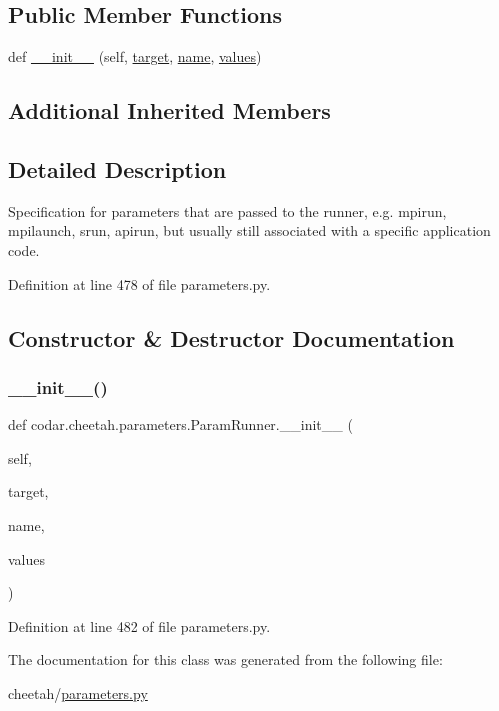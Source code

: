 \subsection*{Public Member Functions}
\begin{DoxyCompactItemize}
\item 
def \hyperlink{classcodar_1_1cheetah_1_1parameters_1_1_param_runner_aac032647089038378eedaa25c24775db}{\+\_\+\+\_\+init\+\_\+\+\_\+} (self, \hyperlink{classcodar_1_1cheetah_1_1parameters_1_1_param_a5603d43a20cfc6447c3718406ce0669e}{target}, \hyperlink{classcodar_1_1cheetah_1_1parameters_1_1_param_ac9982d62cd18a368a3fbc26541e14209}{name}, \hyperlink{classcodar_1_1cheetah_1_1parameters_1_1_param_aefcc82658f511bddd6605e6ac6e74fbf}{values})
\end{DoxyCompactItemize}
\subsection*{Additional Inherited Members}


\subsection{Detailed Description}
\begin{DoxyVerb}Specification for parameters that are passed to the runner, e.g.
mpirun, mpilaunch, srun, apirun, but usually still associated with a
specific application code.\end{DoxyVerb}
 

Definition at line 478 of file parameters.\+py.



\subsection{Constructor \& Destructor Documentation}
\mbox{\label{classcodar_1_1cheetah_1_1parameters_1_1_param_runner_aac032647089038378eedaa25c24775db}} 
\subsubsection{\texorpdfstring{\+\_\+\+\_\+init\+\_\+\+\_\+()}{\_\_init\_\_()}}
{\footnotesize\ttfamily def codar.\+cheetah.\+parameters.\+Param\+Runner.\+\_\+\+\_\+init\+\_\+\+\_\+ (\begin{DoxyParamCaption}\item[{}]{self,  }\item[{}]{target,  }\item[{}]{name,  }\item[{}]{values }\end{DoxyParamCaption})}



Definition at line 482 of file parameters.\+py.



The documentation for this class was generated from the following file\+:\begin{DoxyCompactItemize}
\item 
cheetah/\hyperlink{parameters_8py}{parameters.\+py}\end{DoxyCompactItemize}
